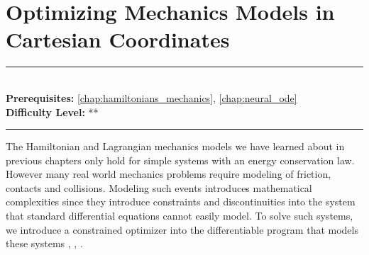 \documentclass[book.tex]{subfiles}
\begin{document}
\chapter{Optimizing Mechanics Models in Cartesian Coordinates}
\label{chap:hamiltonian_nn}
\noindent\rule{11cm}{0.4pt} \\
\textbf{Prerequisites:} \autoref{chap:hamiltonians_mechanics}, \autoref{chap:neural_ode} \\
\textbf{Difficulty Level:} ** \\
\noindent\rule{11cm}{0.4pt}
\vspace{5mm}

The Hamiltonian and Lagrangian mechanics models we have learned about in previous chapters only hold for simple systems with an energy conservation law. However many real world mechanics problems require modeling of friction, contacts and collisions. Modeling such events introduces mathematical complexities since they introduce constraints and discontinuities into the system that standard differential equations cannot easily model. To solve such systems, we introduce a constrained optimizer into the differentiable program that models these systems  \cite{finzi2020generalizing}, \cite{zhong2021benchmarking}, \cite{zhong2021extending}.
\end{document}
